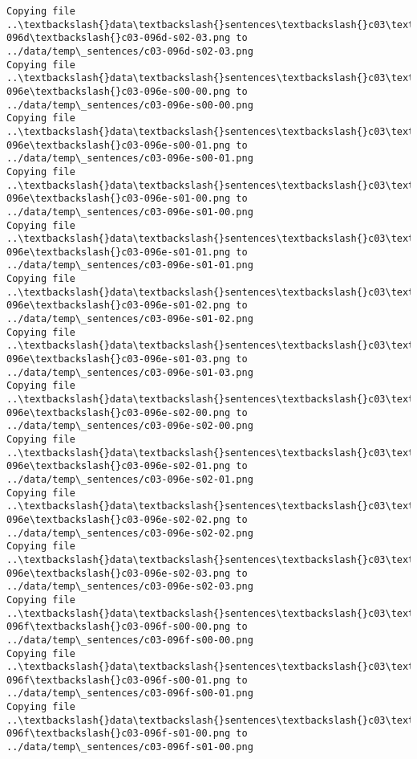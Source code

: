 \documentclass[11pt]{article}
\begin{document}
\begin{Verbatim}[commandchars=\\\{\}]
Copying file ..\textbackslash{}data\textbackslash{}sentences\textbackslash{}c03\textbackslash{}c03-096d\textbackslash{}c03-096d-s02-03.png to
../data/temp\_sentences/c03-096d-s02-03.png
Copying file ..\textbackslash{}data\textbackslash{}sentences\textbackslash{}c03\textbackslash{}c03-096e\textbackslash{}c03-096e-s00-00.png to
../data/temp\_sentences/c03-096e-s00-00.png
Copying file ..\textbackslash{}data\textbackslash{}sentences\textbackslash{}c03\textbackslash{}c03-096e\textbackslash{}c03-096e-s00-01.png to
../data/temp\_sentences/c03-096e-s00-01.png
Copying file ..\textbackslash{}data\textbackslash{}sentences\textbackslash{}c03\textbackslash{}c03-096e\textbackslash{}c03-096e-s01-00.png to
../data/temp\_sentences/c03-096e-s01-00.png
Copying file ..\textbackslash{}data\textbackslash{}sentences\textbackslash{}c03\textbackslash{}c03-096e\textbackslash{}c03-096e-s01-01.png to
../data/temp\_sentences/c03-096e-s01-01.png
Copying file ..\textbackslash{}data\textbackslash{}sentences\textbackslash{}c03\textbackslash{}c03-096e\textbackslash{}c03-096e-s01-02.png to
../data/temp\_sentences/c03-096e-s01-02.png
Copying file ..\textbackslash{}data\textbackslash{}sentences\textbackslash{}c03\textbackslash{}c03-096e\textbackslash{}c03-096e-s01-03.png to
../data/temp\_sentences/c03-096e-s01-03.png
Copying file ..\textbackslash{}data\textbackslash{}sentences\textbackslash{}c03\textbackslash{}c03-096e\textbackslash{}c03-096e-s02-00.png to
../data/temp\_sentences/c03-096e-s02-00.png
Copying file ..\textbackslash{}data\textbackslash{}sentences\textbackslash{}c03\textbackslash{}c03-096e\textbackslash{}c03-096e-s02-01.png to
../data/temp\_sentences/c03-096e-s02-01.png
Copying file ..\textbackslash{}data\textbackslash{}sentences\textbackslash{}c03\textbackslash{}c03-096e\textbackslash{}c03-096e-s02-02.png to
../data/temp\_sentences/c03-096e-s02-02.png
Copying file ..\textbackslash{}data\textbackslash{}sentences\textbackslash{}c03\textbackslash{}c03-096e\textbackslash{}c03-096e-s02-03.png to
../data/temp\_sentences/c03-096e-s02-03.png
Copying file ..\textbackslash{}data\textbackslash{}sentences\textbackslash{}c03\textbackslash{}c03-096f\textbackslash{}c03-096f-s00-00.png to
../data/temp\_sentences/c03-096f-s00-00.png
Copying file ..\textbackslash{}data\textbackslash{}sentences\textbackslash{}c03\textbackslash{}c03-096f\textbackslash{}c03-096f-s00-01.png to
../data/temp\_sentences/c03-096f-s00-01.png
Copying file ..\textbackslash{}data\textbackslash{}sentences\textbackslash{}c03\textbackslash{}c03-096f\textbackslash{}c03-096f-s01-00.png to
../data/temp\_sentences/c03-096f-s01-00.png

\end{Verbatim}
\end{document}
